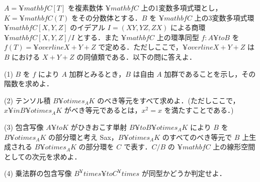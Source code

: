 \documentclass[12pt]{jlreq}
\begin{document}

$A = ¥mathbf{C}[T]$ を複素数体 $¥mathbf{C}$ 上の1変数多項式環とし，$K = ¥mathbf{C}(T)$ をその分数体とする．$B$ を $¥mathbf{C}$ 上の3変数多項式環 $¥mathbf{C}[X,Y,Z]$ のイデアル $I = (XY,YZ,ZX)$ による商環 $¥mathbf{C}[X,Y,Z]/I$ とする．また $¥mathbf{C}$ 上の環準同型 $f : A ¥to B$ を $f(T) = ¥overline{X+Y+Z}$ で定める．ただしここで，$¥overline{X+Y+Z}$ は $B$ における $X+Y+Z$ の同値類である．以下の問に答えよ．

(1) $B$ を $f$ により $A$ 加群とみるとき，$B$ は自由 $A$ 加群であることを示し，その階数を求めよ．

(2) テンソル積 $B ¥otimes_A K$ のべき等元をすべて求めよ．(ただしここで，$x ¥in B ¥otimes_A K$ がべき等元であるとは，$x^2 = x$ を満たすことである．)

(3) 包含写像 $A ¥to K$ がひきおこす単射 $B ¥to B ¥otimes_A K$ により $B$ を $B ¥otimes_A K$ の部分環と考え Sax，$B ¥otimes_A K$ のすべてのべき等元で $B$ 上生成される $B ¥otimes_A K$ の部分環を $C$ で表す．$C/B$ の $¥mathbf{C}$ 上の線形空間としての次元を求めよ．

(4) 乗法群の包含写像 $B^¥times ¥to C^¥times$ が同型かどうか判定せよ．
\end{document}
